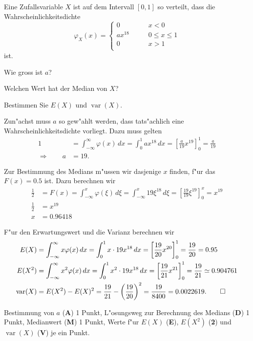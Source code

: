 Eine Zufallsvariable $X$ ist auf dem Intervall $[0,1]$ so verteilt, dass die
Wahrscheinlichkeitsdichte
\[
\varphi_X(x)=\begin{cases}
0&\qquad x < 0\\
ax^{18}&\qquad 0\le x \le 1\\
0&\qquad x > 1\\
\end{cases}
\]
ist.
\begin{teilaufgaben}
\item Wie gross ist $a$?
\item Welchen Wert hat der Median von $X$?
\item Bestimmen Sie $E(X)$ und $\operatorname{var}(X)$.
\end{teilaufgaben}

\begin{loesung}
\begin{teilaufgaben}
\item
Zun"achst muss $a$ so gew"ahlt werden, dass tats"achlich eine
Wahrscheinlichkeitsdichte vorliegt. Dazu muss gelten
\begin{align*}
1
&=
\int_{-\infty}^{\infty} \varphi(x)\,dx
=
\int_0^1 ax^{18}\,dx
=
\left[
\frac{a}{19}x^{19}
\right]_0^1
=\frac{a}{19}
\\
\Rightarrow \qquad a&= 19.
\end{align*}
\item
Zur Bestimmung des Medians m"ussen wir dasjenige $x$ finden, f"ur das 
$F(x)=0.5$ ist. Dazu berechnen wir
\begin{align*}
\frac12
&=
F(x)
=
\int_{-\infty}^x \varphi(\xi)\,d\xi
=
\int_{-\infty}^x 19\xi^{18}\,d\xi
=
\left[
\frac{19}{19}\xi^{19}
\right]_0^x
=x^{19}
\\
\frac12&=x^{19}\\
x&=0.96418
\end{align*}
\item
F"ur den Erwartungswert und die Varianz berechnen wir
\begin{align*}
E(X)
&=
\int_{-\infty}^\infty x\varphi(x)\,dx
=
\int_0^1x\cdot 19x^{18}\,dx
=
\left[
\frac{19}{20}x^{20}
\right]_0^1
=\frac{19}{20}=0.95
\\
E(X^2)
&=
\int_{-\infty}^\infty x^2\varphi(x)\,dx
=
\int_0^1x^2\cdot 19x^{18}\,dx
=
\left[
\frac{19}{21}x^{21}
\right]_0^1
=\frac{19}{21}
\simeq 0.904761
\\
\operatorname{var}(X)
&=
E(X^2)-E(X)^2
=
\frac{19}{21}-\biggl(\frac{19}{20}\biggr)^2
=
\frac{19}{8400}=0.0022619.
\qedhere
\end{align*}
\end{teilaufgaben}
\end{loesung}

\begin{bewertung}
Bestimmung von $a$ ({\bf A}) 1 Punkt,
L"osungsweg zur Berechnung des Medians ({\bf D}) 1 Punkt,
Medianwert ({\bf M}) 1 Punkt,
Werte f"ur $E(X)$ ({\bf E}),
$E(X^2)$  ({\bf 2}) und $\operatorname{var}(X)$ ({\bf V}) je ein Punkt.
\end{bewertung}

